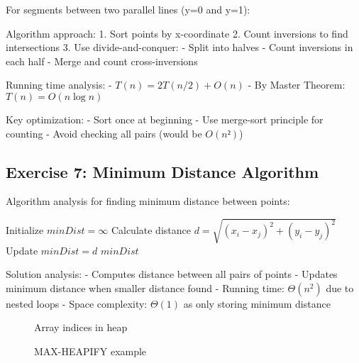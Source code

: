 For segments between two parallel lines (y=0 and y=1):

Algorithm approach:
1. Sort points by x-coordinate
2. Count inversions to find intersections
3. Use divide-and-conquer:
   - Split into halves
   - Count inversions in each half
   - Merge and count cross-inversions

Running time analysis:
- $T(n) = 2T(n/2) + O(n)$
- By Master Theorem: $T(n) = O(n \log n)$

Key optimization:
- Sort once at beginning
- Use merge-sort principle for counting
- Avoid checking all pairs (would be $O(n²)$)

\subsection{Exercise 7: Minimum Distance Algorithm}

Algorithm analysis for finding minimum distance between points:

\begin{algorithmic}[1]
\State Initialize $minDist = \infty$
    \State Calculate distance $d = \sqrt{(x_i-x_j)^2 + (y_i-y_j)^2}$
        \State Update $minDist = d$
    \EndIf
\EndFor
\State \Return $minDist$
\EndProcedure
\end{algorithmic}

Solution analysis:
- Computes distance between all pairs of points
- Updates minimum distance when smaller distance found
- Running time: $\Theta(n^2)$ due to nested loops
- Space complexity: $\Theta(1)$ as only storing minimum distance

\begin{figure}[h]
\centering
{}
\caption{Array indices in heap}
\label{fig:heap-indices}
\end{figure}

\begin{figure}[h]
\centering
{}
\caption{MAX-HEAPIFY example}
\label{fig:max-heapify}
\end{figure}

